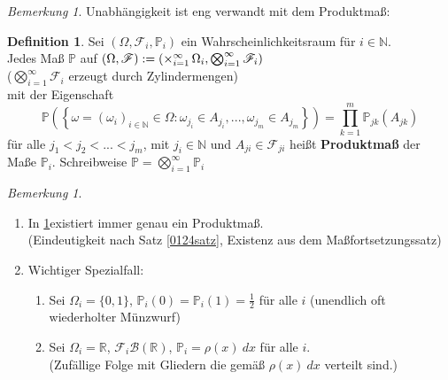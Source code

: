\documentclass[10pt,a4paper]{article}
\newcommand{\N}{\ensuremath{\mathbb{N}}}
\newcommand{\R}{\ensuremath{\mathbb{R}}}
\newcommand{\Bor}{\mathscr B}
\newcommand{\bigtimes}{\operatornamewithlimits{\times}}
\newcommand{\Prb}{\mathbb P}
\newcommand{\scF}{\ensuremath{\mathscr{F}}}
\theoremstyle{plain}
\theoremstyle{definition}
\newtheorem{definition}[theorem]{Definition}
\theoremstyle{remark}
\newtheorem{bem}[theorem]{Bemerkung}
\newtheorem*{bem*}{Bemerkung}
\begin{document}
	\begin{bem*}
		Unabhängigkeit ist eng verwandt mit dem Produktmaß:
	\end{bem*}

	\setcounter{theorem}{20}
	\begin{definition}\label{0321def}
		Sei $(\Omega,\scF_i,\Prb_i)$ ein Wahrscheinlichkeitsraum für $i\in\N$.\\
		Jedes Maß $\Prb$ auf $(\Omega,\scF):=\left(\bigtimes_{i=1}^\infty \Omega_i,\bigotimes_{i=1}^\infty\scF_i\right)$\\
		($\bigotimes_{i=1}^\infty\scF_i$ erzeugt durch Zylindermengen)\\
		mit der Eigenschaft
		\[\Prb\left(\left\{\omega=(\omega_i)_{i\in \N}\in\Omega:\omega_{j_i}\in A
		_{j_i},...,\omega_{j_m}\in A_{j_m}\right\}\right)=\prod_{k=1}^m\Prb_{jk}(A_{jk})\tag{3.2}\]
		für alle $j_1<j_2<...<j_m$, mit $j_i\in\N$ und $A_{ji}\in\scF_{ji}$ heißt \textbf{Produktmaß} der Maße $\Prb_i$. Schreibweise $\Prb=\bigotimes_{i=1}^\infty\Prb_i$
	\end{definition}

	\begin{bem}
		\begin{enumerate}[label=\alph*)]
			\item In \ref{0321def}existiert immer genau ein Produktmaß.\\
			(Eindeutigkeit nach Satz \ref{0124satz}, Existenz aus dem Maßfortsetzungssatz)
			\item Wichtiger Spezialfall:
			\begin{enumerate}[label=(\roman*)]
				\item Sei $\Omega_i=\{0,1\}$, $\Prb_i(0)=\Prb_i(1)=\frac{1}{2}$ für alle $i$ (unendlich oft wiederholter Münzwurf)
				\item Sei $\Omega_i=\R$, $\scF_i\Bor(\R)$, $\Prb_i=\rho(x)~dx$ für alle $i$.\\
				(Zufällige Folge mit Gliedern die gemäß $\rho(x)~dx$ verteilt sind.)
			\end{enumerate}
		\end{enumerate}
	\end{bem}
\end{document}
